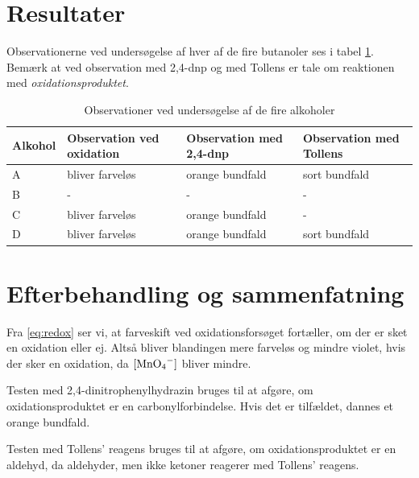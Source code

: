 \documentclass{report}
\begin{document}
\section*{Resultater}
Observationerne ved undersøgelse af hver af de fire butanoler ses i tabel \ref{tab:observationer}.
Bemærk at ved observation med 2,4-dnp og med Tollens er tale om reaktionen med \textit{oxidationsproduktet}.
\begin{table}[H]
\centering
\begin{tabular}{@{}llll@{}}
\toprule
Alkohol & Observation ved oxidation & Observation med 2,4-dnp & Observation med Tollens \\ \midrule
A       & bliver farveløs           & orange bundfald         & sort bundfald           \\
B       & -                         & -                       & -                       \\
C       & bliver farveløs           & orange bundfald         & -                       \\
D       & bliver farveløs           & orange bundfald         & sort bundfald           \\ \bottomrule
\end{tabular}
\caption{Observationer ved undersøgelse af de fire alkoholer}
\label{tab:observationer}
\end{table}

\section*{Efterbehandling og sammenfatning}
Fra \cref{eq:redox} ser vi, at farveskift ved oxidationsforsøget fortæller, om der er sket en oxidation eller ej.
Altså bliver blandingen mere farveløs og mindre violet, hvis der sker en oxidation, da $[\ce{MnO4-}]$ bliver mindre. 

Testen med 2,4-dinitrophenylhydrazin bruges til at afgøre, om oxidationsproduktet er en carbonylforbindelse.
Hvis det er tilfældet, dannes et orange bundfald.

Testen med Tollens' reagens bruges til at afgøre, om oxidationsproduktet er en aldehyd, da aldehyder, men ikke ketoner reagerer med Tollens' reagens.
\end{document}

